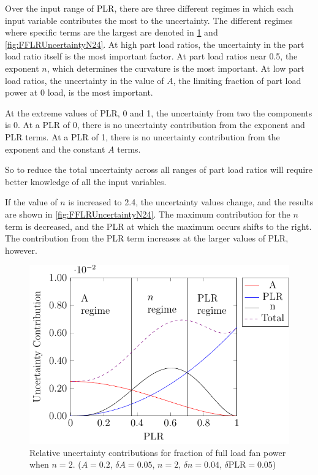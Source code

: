 Over the input range of PLR, there are three different regimes in which
each input variable contributes the most to the uncertainty. The
different regimes where specific terms are the largest are denoted in
\figref{} \ref{fig:FFLRUncertainty} and \ref{fig:FFLRUncertaintyN24}. At high
part load ratios, the uncertainty in the part load ratio itself is the
most important factor. At part load ratios near 0.5, the exponent \(n\),
which determines the curvature is the most important. At low part load
ratios, the uncertainty in the value of \(A\), the limiting fraction of
part load power at 0 load, is the most important.

At the extreme values of PLR, 0 and 1, the uncertainty from two the
components is 0. At a PLR of 0, there is no uncertainty contribution
from the exponent and PLR terms. At a PLR of 1, there is no uncertainty
contribution from the exponent and the constant \(A\) terms. 

So to reduce the total uncertainty across all ranges of part load ratios
will require better knowledge of all the input variables.

If the value of \(n\) is increased to 2.4, the uncertainty values
change, and the results are shown in \figref{}
\ref{fig:FFLRUncertaintyN24}. The maximum contribution for the \(n\)
term is decreased, and the PLR at which the maximum occurs shifts to the
right. The contribution from the PLR term increases at the larger values
of PLR, however.

\begin{figure}
\centering
\includegraphics[]{Plots/2017-05-15-FFLPUncertainty.pdf}
\caption{Relative uncertainty contributions for fraction of full load
fan power when \(n=2\). (\(A=0.2\), \(\delta A = 0.05\), \(n=2\), \(\delta n =0.04\), \(\delta \text{PLR}=0.05\))}
\label{fig:FFLRUncertainty}
\end{figure}

